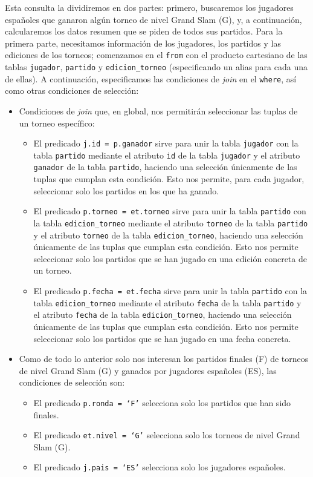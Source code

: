 \documentclass[11pt]{opticajnl}
\begin{document}
Esta consulta la dividiremos en dos partes: primero, buscaremos los jugadores españoles que ganaron algún torneo de nivel Grand Slam (G), y, a continuación, calcularemos los datos resumen que se piden de todos sus partidos. Para la primera parte, necesitamos información de los jugadores, los partidos y las ediciones de los torneos; comenzamos en el \texttt{from} con el producto cartesiano de las tablas \texttt{jugador}, \texttt{partido} y \texttt{edicion\_torneo} (especificando un alias para cada una de ellas). A continuación, especificamos las condiciones de \textit{join} en el \texttt{where}, así como otras condiciones de selección:
\begin{itemize}
\item Condiciones de \textit{join} que, en global, nos permitirán seleccionar las tuplas de un torneo específico:
\begin{itemize}
\item El predicado \texttt{j.id = p.ganador} sirve para unir la tabla \texttt{jugador} con la tabla \texttt{partido} mediante el atributo \texttt{id} de la tabla \texttt{jugador} y el atributo \texttt{ganador} de la tabla \texttt{partido}, haciendo una selección únicamente de las tuplas que cumplan esta condición. Esto nos permite, para cada jugador, seleccionar solo los partidos en los que ha ganado. 
\item El predicado \texttt{p.torneo = et.torneo} sirve para unir la tabla \texttt{partido} con la tabla \texttt{edicion\_torneo} mediante el atributo \texttt{torneo} de la tabla \texttt{partido} y el atributo \texttt{torneo} de la tabla \texttt{edicion\_torneo}, haciendo una selección únicamente de las tuplas que cumplan esta condición. Esto nos permite seleccionar solo los partidos que se han jugado en una edición concreta de un torneo.
\item El predicado \texttt{p.fecha = et.fecha} sirve para unir la tabla \texttt{partido} con la tabla \texttt{edicion\_torneo} mediante el atributo \texttt{fecha} de la tabla \texttt{partido} y el atributo \texttt{fecha} de la tabla \texttt{edicion\_torneo}, haciendo una selección únicamente de las tuplas que cumplan esta condición. Esto nos permite seleccionar solo los partidos que se han jugado en una fecha concreta.
\end{itemize}
\item Como de todo lo anterior solo nos interesan los partidos finales (F) de torneos de nivel Grand Slam (G) y ganados por jugadores españoles (ES), las condiciones de selección son:
\begin{itemize}
\item El predicado \texttt{p.ronda = `F'} selecciona solo los partidos que han sido finales.
\item El predicado \texttt{et.nivel = `G'} selecciona solo los torneos de nivel Grand Slam (G).
\item El predicado \texttt{j.pais = `ES'} selecciona solo los jugadores españoles.
\end{itemize}
\end{itemize}
\end{document}
